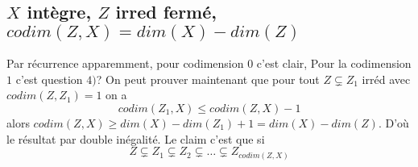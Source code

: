 \documentclass[a4paper,12pt]{book}
\theoremstyle{plain}
\theoremstyle{definition}
\theoremstyle{remark}
\begin{document}
\subsection{$X$ intègre, $Z$ irred fermé, $codim(Z,X)=dim(X)-dim(Z)$}
Par récurrence apparemment, pour codimension $0$ c'est clair, 
Pour la codimension $1$ c'est question $4)$? On peut prouver maintenant
que pour tout $Z\subsetneq Z_1$ irréd avec $codim(Z,Z_1)=1$ on a
\[codim(Z_1,X)\leq codim(Z,X)-1\]
alors $codim(Z,X)\geq dim(X)-dim(Z_1)+1=dim(X)-dim(Z)$. D'où le
résultat par double inégalité.
\newline
Le claim c'est que si 
\[Z\subsetneq Z_1\subsetneq Z_2\subsetneq\ldots\subsetneq Z_{codim(Z,X)}\]











\printbibliography
\end{document}
